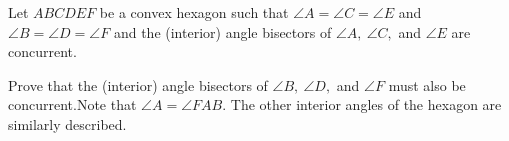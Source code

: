 Let $ABCDEF$ be a convex hexagon such that $\angle A = \angle C = \angle E$ and $\angle B = \angle D = \angle F$ and the (interior) angle bisectors of $\angle A, ~\angle C,$ and $\angle E$ are concurrent.

Prove that the (interior) angle bisectors of $\angle B, ~\angle D, $ and $\angle F$ must also be concurrent.Note that $\angle A = \angle FAB$.  The other interior angles of the hexagon are similarly described.